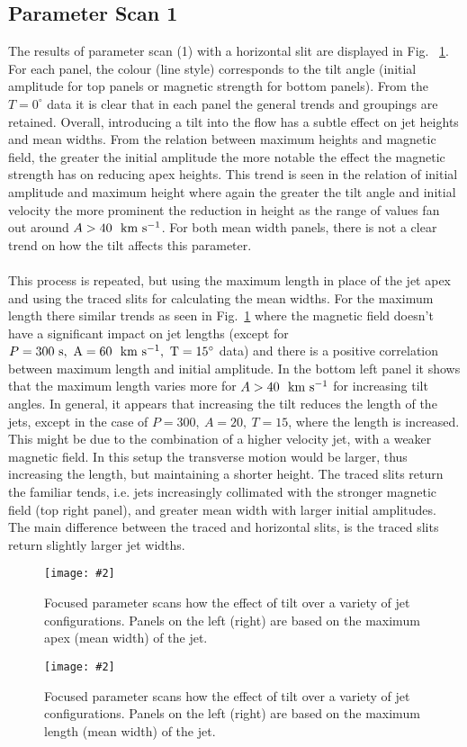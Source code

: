\documentclass[12pt]{ociamthesis}
\newcommand{\mfig}[4]{
  \begin{figure}
  \begin{center}
  \texttt{[image: \#2]}
  \caption{#3}
  \label{#4}
  \end{center}
  \end{figure}}
\newcommand{\kms}{~\rm{km ~s^{-1}}}
\newcommand{\np}{\\ \\}
\begin{document}
\subsection{Parameter Scan 1}
\label{subsec:pscansII_I}
The results of parameter scan (1) with a horizontal slit are displayed in Fig. ~\ref{p_scan_t_apex}. For each panel, the colour (line style) corresponds to the tilt angle (initial amplitude for top panels or magnetic strength for bottom panels). From the $T=0^{\circ}$ data it is clear that in each panel the general trends and groupings are retained. Overall, introducing a tilt into the flow has a subtle effect on jet heights and mean widths. From the relation between maximum heights and magnetic field, the greater the initial amplitude the more notable the effect the magnetic strength has on reducing apex heights. This trend is seen in the relation of initial amplitude and maximum height where again the greater the tilt angle and initial velocity the more prominent the reduction in height as the range of values fan out around $A>40~\kms$. For both mean width panels, there is not a clear trend on how the tilt affects this parameter. \np
%
This process is repeated, but using the maximum length in place of the jet apex and using the traced slits for calculating the mean widths. For the maximum length there similar trends as seen in Fig.~\ref{p_scan_t_apex} where the magnetic field doesn't have a significant impact on jet lengths (except for $P=300~\rm{s},~A=60~\kms,~T=15^{\circ}$ data) and there is a positive correlation between maximum length and initial amplitude. In the bottom left panel it shows that the maximum length varies more for $A>40~\kms$ for increasing tilt angles. In general, it appears that increasing the tilt reduces the length of the jets, except in the case of $P=300,~A=20,~T=15$, where the length is increased. This might be due to the combination of a higher velocity jet, with a weaker magnetic field. In this setup the transverse motion would be larger, thus increasing the length, but maintaining a shorter height. The traced slits return the familiar tends, i.e. jets increasingly collimated with the stronger magnetic field (top right panel), and greater mean width with larger initial amplitudes. The main difference between the traced and horizontal slits, is the traced slits return slightly larger jet widths.
\mfig{1}{figures/horizontal_slit_pscan_fixing.png}{Focused parameter scans how the effect of tilt over a variety of jet configurations. Panels on the left (right) are based on the maximum apex (mean width) of the jet.}{p_scan_t_apex}
%
\mfig{1}{figures/traced_slit_pscan_fixing.png}{Focused parameter scans how the effect of tilt over a variety of jet configurations. Panels on the left (right) are based on the maximum length (mean width) of the jet.}{p_scan_t_len}
\end{document}
